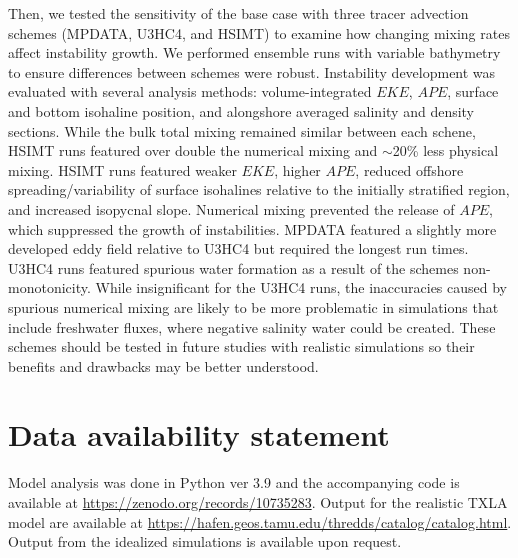 Then, we tested the sensitivity of the base case with three tracer advection schemes (MPDATA, U3HC4, and HSIMT) to examine how changing mixing rates affect instability growth. We performed ensemble runs with variable bathymetry to ensure differences between schemes were robust. Instability development was evaluated with several analysis methods: volume-integrated $EKE$, $APE$, surface and bottom isohaline position, and alongshore averaged salinity and density sections. While the bulk total mixing remained similar between each schene, HSIMT runs featured over double the numerical mixing and $\sim$20\% less physical mixing. HSIMT runs featured weaker $EKE$, higher $APE$, reduced offshore spreading/variability of surface isohalines relative to the initially stratified region, and increased isopycnal slope. Numerical mixing prevented the release of $APE$, which suppressed the growth of instabilities. MPDATA featured a slightly more developed eddy field relative to U3HC4 but required the longest run times. U3HC4 runs featured spurious water formation as a result of the schemes non-monotonicity. While insignificant for the U3HC4 runs, the inaccuracies caused by spurious numerical mixing are likely to be more problematic in simulations that include freshwater fluxes, where negative salinity water could be created. These schemes should be tested in future studies with realistic simulations so their benefits and drawbacks may be better understood. 

\section{Data availability statement}
Model analysis was done in Python ver 3.9 and the accompanying code is available at \url{https://zenodo.org/records/10735283}. Output for the realistic TXLA model are available at \url{https://hafen.geos.tamu.edu/thredds/catalog/catalog.html}. Output from the idealized simulations is available upon request.

